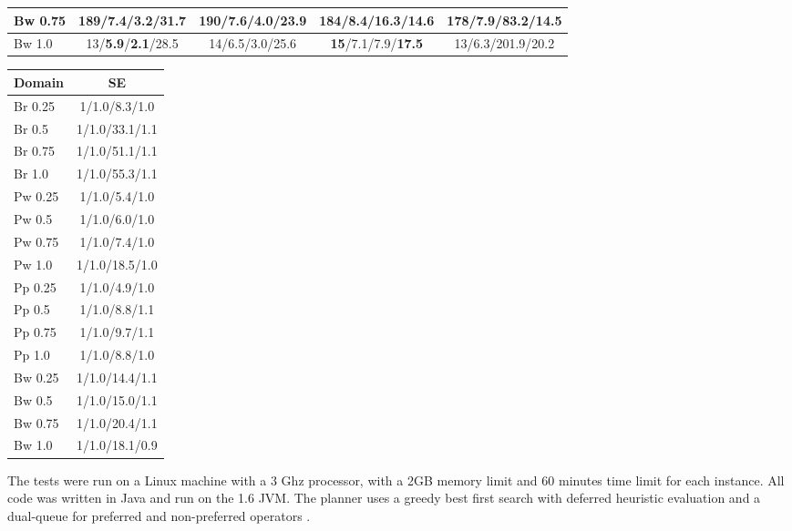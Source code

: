 \documentclass{article}
\begin{document}
\begin{table*}
\begin{minipage}{5in}
\begin{tabular}{|@{}l@{}|@{}c@{ }c@{ }c@{ }c@{}|}
Bw	0.75	&189/{\bf 7.4}/{\bf 3.2}/31.7 	&{\bf 190}/7.6/4.0/23.9 	&184/8.4/16.3/14.6 	&178/7.9/83.2/{\bf 14.5} 	\\ \hline
Bw	1.0	&13/{\bf 5.9}/{\bf 2.1}/28.5 	&14/6.5/3.0/25.6 	&{\bf 15}/7.1/7.9/{\bf 17.5} 	&13/6.3/201.9/20.2 	\\ \hline
\end{tabular}\caption{\label{tab:questionComp1} Goal-directed KA
Average Performance using . Bold indicates best performance. (Num
Solved/Num Steps/Time (s)/Questions)}
\end{minipage}
\begin{minipage}{1.75in}
\small\begin{tabular}{|l|c|}\hline
Domain & SE  \\ \hline
Br	0.25	&1/1.0/8.3/1.0 	\\ \hline
Br	0.5	&1/1.0/33.1/1.1 	\\ \hline
Br	0.75	&1/1.0/51.1/1.1 	\\ \hline
Br	1.0	&1/1.0/55.3/1.1 	\\ \hline
\hline
Pw	0.25	&1/1.0/5.4/1.0 	\\ \hline
Pw	0.5	&1/1.0/6.0/1.0 	\\ \hline
Pw	0.75	&1/1.0/7.4/1.0 	\\ \hline
Pw	1.0	&1/1.0/18.5/1.0 	\\ \hline
\hline
Pp	0.25	&1/1.0/4.9/1.0 	\\ \hline
Pp	0.5	&1/1.0/8.8/1.1 	\\ \hline
Pp	0.75	&1/1.0/9.7/1.1 	\\ \hline
Pp	1.0	&1/1.0/8.8/1.0 	\\ \hline
\hline
Bw	0.25	&1/1.0/14.4/1.1 	\\ \hline
Bw	0.5	&1/1.0/15.0/1.1 	\\ \hline
Bw	0.75	&1/1.0/20.4/1.1 	\\ \hline
Bw	1.0	&1/1.0/18.1/0.9 	\\ \hline
\end{tabular}\caption{\label{tab:rpComp} Plan versus
Relaxed Plan Ratio in SE.}
\end{minipage}
\end{table*}


 The tests were run on a Linux machine with a 3 Ghz processor,
with a  2GB memory limit and 60 minutes time limit for each instance. All code
was written in Java and run on the 1.6 JVM. The \FFRISKY{} planner uses a greedy
best first search with deferred heuristic evaluation and a dual-queue for
preferred and non-preferred operators \citep{DBLP:journals/jair/Helmert06}. 
\end{document}
